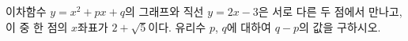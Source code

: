 이차함수 $y=x^2+px+q$의 그래프와 직선 $y=2x-3$은 서로 다른 두 점에서 만나고, 이 중 한 점의 $x$좌표가 $2+\sqrt{5}$이다. 유리수 $p$, $q$에 대하여 $q-p$의 값을 구하시오.
